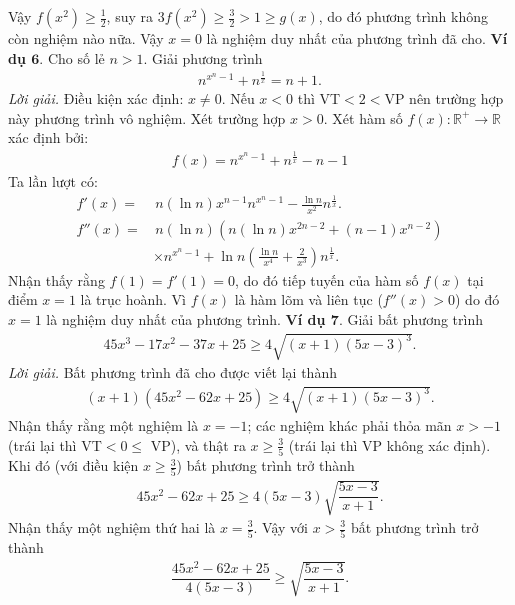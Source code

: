 \begin{multicols}{2}
	\vskip 0.1cm
	Vậy $f(x^2)\ge \frac 12$, suy ra $3f(x^2)\ge \frac 32 > 1\ge g(x)$, do đó phương trình không còn nghiệm nào nữa. 
	\vskip 0.1cm
	Vậy $x=0$ là nghiệm duy nhất của phương trình đã cho.
	\vskip 0.1cm
	\textbf{\color{diendantoanhoc}Ví dụ $\pmb{6.}$} Cho số lẻ $n>1$. Giải phương trình
	\begin{align*}
		n^{x^n-1}+n^{\frac{1}{x}}=n+1.
	\end{align*}
	\textit{Lời giải.} Điều kiện xác định: $x \neq 0$. 
	Nếu $x<0$ thì VT$<2<$VP nên trường hợp này phương trình vô nghiệm.
	\vskip 0.1cm
	Xét trường hợp $x>0$. Xét hàm số $f(x):\mathbb R^+\to \mathbb R$ xác định bởi:
	\begin{align*}
		f(x)=n^{x^n-1}+n^{\frac 1x}-n-1
	\end{align*}
	Ta lần lượt có:
	\begin{align*}
		f'(x)=&\,n(\ln n)x^{n-1}n^{x^n-1}-\frac {\ln n}{x^2}n^{\frac 1x}.\\
		f''(x)=&\,n(\ln n)\left(n(\ln n)x^{2n-2}+(n-1)x^{n-2}\right)\\
		&\times n^{x^n-1}+\ln n\left(\frac {\ln n}{x^4}+\frac 2{x^3}\right)n^{\frac 1x}.
	\end{align*}
	Nhận thấy rằng $f(1)=f'(1)=0$, do đó tiếp tuyến của hàm số $f(x)$ tại điểm $x=1$ là trục hoành.
	\vskip 0.1cm 
	Vì $f(x)$ là hàm lõm và liên tục ($f''(x)>0$) do đó $x=1$ là nghiệm duy nhất của phương trình. 
	\vskip 0.1cm
	\textbf{\color{diendantoanhoc}Ví dụ $\pmb{7.}$} Giải bất phương trình
	\begin{align*}
		45x^3\!-\!17x^2\!-\!37x\!+\!25\!\ge\! 4\sqrt{\!\!(x\!+\!1)(5x\!-\!3)^3}.
	\end{align*}
	\textit{Lời giải.} Bất phương trình đã cho được viết lại thành 
	\begin{align*}
		(x\!+\!1\!)(45x^2\!-\!62x\!+\!25)\!\ge\! 4\sqrt{\!\!(x\!+\!1\!)(5x\!-\!3)^3}.
	\end{align*}
	Nhận thấy rằng một nghiệm là $x=-1$; các nghiệm khác phải thỏa mãn $x>-1$ (trái lại thì VT$<0\le$ VP), và thật ra $x\ge\frac 35$ (trái lại thì VP không xác định).
	\vskip 0.1cm
	Khi đó (với điều kiện $x\ge\frac 35$) bất phương trình trở thành
	\begin{align*}
		45x^2-62x+25\ge 4(5x-3)\sqrt{\dfrac{5x-3}{x+1}}.
	\end{align*}
	Nhận thấy một nghiệm thứ hai là $x=\frac 35$. Vậy với $x>\frac 35$ bất phương trình trở thành
	\begin{align*}
		\dfrac{45x^2-62x+25}{4(5x-3)}\ge \sqrt{\dfrac{5x-3}{x+1}}.
	\end{align*}

\end{multicols}
